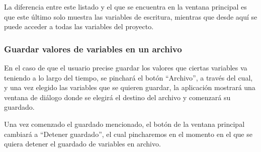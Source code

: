 
La diferencia entre este listado y el que se encuentra en la ventana principal es que este último solo muestra las variables de escritura, mientras que desde aquí se puede acceder a todas las variables del proyecto.

\subsubsection{Guardar valores de variables en un archivo}

En el caso de que el usuario precise guardar los valores que ciertas variables va teniendo a lo largo del tiempo, se pinchará el botón ``Archivo'', a través del cual, y una vez elegido las variables que se quieren guardar, la aplicación mostrará una ventana de diálogo donde se elegirá el destino del archivo y comenzará su guardado.

Una vez comenzado el guardado mencionado, el botón de la ventana principal cambiará a ``Detener guardado'', el cual pincharemos en el momento en el que se quiera detener el guardado de variables en archivo.
